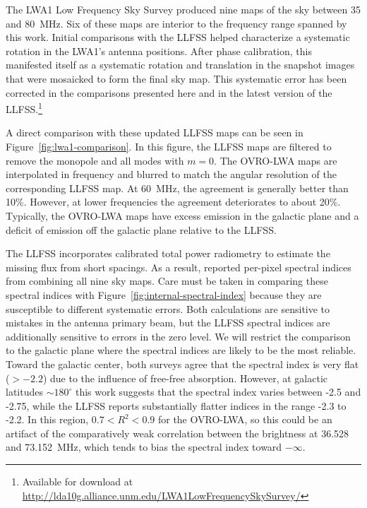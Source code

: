\begin{bibunit}
The LWA1 Low Frequency Sky Survey \citep[LLFSS;][]{2017MNRAS.469.4537D} produced nine maps of the
sky between 35 and 80~MHz. Six of these maps are interior to the frequency range spanned by this
work. Initial comparisons with the LLFSS helped characterize a systematic rotation in the LWA1's
antenna positions. After phase calibration, this manifested itself as a systematic rotation and
translation in the snapshot images that were mosaicked to form the final sky map. This systematic
error has been corrected in the comparisons presented here and in the latest version of the
LLFSS.\footnote{
    Available for download at \url{http://lda10g.alliance.unm.edu/LWA1LowFrequencySkySurvey/}
}

A direct comparison with these updated LLFSS maps can be seen in Figure~\ref{fig:lwa1-comparison}.
In this figure, the LLFSS maps are filtered to remove the monopole and all modes with $m=0$. The
OVRO-LWA maps are interpolated in frequency and blurred to match the angular resolution of the
corresponding LLFSS map.  At 60~MHz, the agreement is generally better than 10\%. However, at lower
frequencies the agreement deteriorates to about 20\%.  Typically, the OVRO-LWA maps have excess
emission in the galactic plane and a deficit of emission off the galactic plane relative to the
LLFSS.

The LLFSS incorporates calibrated total power radiometry to estimate the missing flux from short
spacings. As a result, \citet{2017MNRAS.469.4537D} reported per-pixel spectral indices from combining
all nine sky maps. Care must be taken in comparing these spectral indices with
Figure~\ref{fig:internal-spectral-index} because they are susceptible to different systematic
errors. Both calculations are sensitive to mistakes in the antenna primary beam, but the LLFSS
spectral indices are additionally sensitive to errors in the zero level. We will restrict the
comparison to the galactic plane where the spectral indices are likely to be the most reliable.
Toward the galactic center, both surveys agree that the spectral index is very flat ($>-2.2$) due to
the influence of free-free absorption.  However, at galactic latitudes $\sim 180^\circ$ this work
suggests that the spectral index varies between -2.5 and -2.75, while the LLFSS reports
substantially flatter indices in the range -2.3 to -2.2. In this region, $0.7 < R^2 < 0.9$ for the
OVRO-LWA, so this could be an artifact of the comparatively weak correlation between the brightness
at 36.528 and 73.152~MHz, which tends to bias the spectral index toward $-\infty$.


\end{bibunit}
